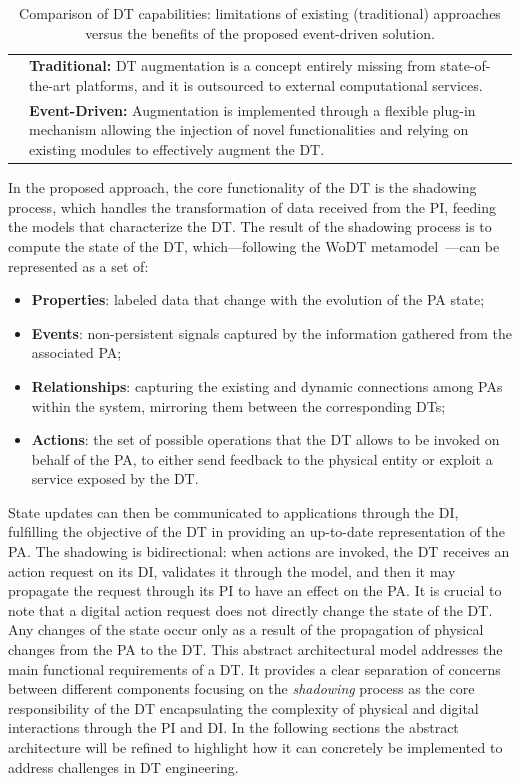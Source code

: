 \begin{table}
\begin{tabularx}{\textwidth}{>{\arraybackslash}m{2.5cm} >{\arraybackslash}X}
\multirow{2}{*}{\textbf{Augmentation}} 
& \textbf{Traditional:} DT augmentation is a concept entirely missing from state-of-the-art platforms, and it is outsourced to external computational services. \\
& \textbf{Event-Driven:} Augmentation is implemented through a flexible plug-in mechanism allowing the injection of novel functionalities and relying on existing modules to effectively augment the DT. \\ \hline
\end{tabularx}

\caption{Comparison of DT capabilities: limitations of existing (traditional) approaches versus the benefits of the proposed event-driven solution.}
\label{tab:evaluation}
\end{table}

In the proposed approach, the core functionality of the \ac{DT} is the shadowing process, which handles the transformation of data received from the \ac{PI}, feeding the models that characterize the \ac{DT}.
%
The result of the shadowing process is to compute the state of the \ac{DT}, which---following the \ac{WoDT} metamodel~\cite{web-of-dt-ricci-2022}---can be represented as a set of: 
\begin{itemize}
\item \textbf{Properties}: labeled data that change with the evolution of the \ac{PA} state;
\item \textbf{Events}: non-persistent signals captured by the information gathered from the associated \ac{PA};
\item \textbf{Relationships}: capturing the existing and dynamic connections among \acp{PA} within the system, mirroring them between the corresponding \acp{DT}; 
\item \textbf{Actions}: the set of possible operations that the \ac{DT} allows to be invoked on behalf of the \ac{PA}, to either send feedback to the physical entity or exploit a service exposed by the \ac{DT}.
\end{itemize}
%
State updates can then be communicated to applications through the \ac{DI}, fulfilling the objective of the \ac{DT} in providing an up-to-date representation of the \ac{PA}.
%
The shadowing is bidirectional:
when actions are invoked, the \ac{DT} receives an action request on its \ac{DI}, validates it through the model, and then it may propagate the request through its \ac{PI} to have an effect on the \ac{PA}.
It is crucial to note that a digital action request does not directly change the state of the \ac{DT}.
Any changes of the state occur only as a result of the propagation of physical changes from the \ac{PA} to the \ac{DT}.
This abstract architectural model addresses the main functional requirements of a \ac{DT}.
It provides a clear separation of concerns between different components focusing on the \emph{shadowing} process as the core responsibility of the \ac{DT} encapsulating the complexity of physical and digital interactions through the \ac{PI} and \ac{DI}. 
%
In the following sections the abstract architecture will be refined to highlight how it can concretely be implemented to address challenges in \ac{DT} engineering.


